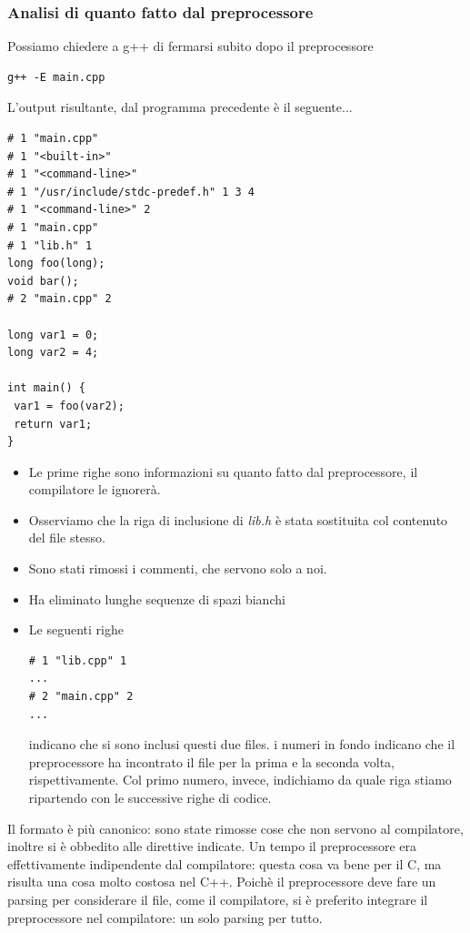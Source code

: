 \documentclass[11pt]{report}
\theoremstyle{definition}
\begin{document}
\subsubsection{Analisi di quanto fatto dal preprocessore} Possiamo chiedere a g++ di fermarsi subito dopo il preprocessore
\begin{verbatim}
g++ -E main.cpp
\end{verbatim}
L'output risultante, dal programma precedente è il seguente...
\begin{verbatim}
# 1 "main.cpp"
# 1 "<built-in>"
# 1 "<command-line>"
# 1 "/usr/include/stdc-predef.h" 1 3 4
# 1 "<command-line>" 2
# 1 "main.cpp"
# 1 "lib.h" 1
long foo(long);
void bar();
# 2 "main.cpp" 2

long var1 = 0;
long var2 = 4;

int main() {
 var1 = foo(var2);
 return var1;
}
\end{verbatim}
\begingroup
\begin{itemize}
\item Le prime righe sono informazioni su quanto fatto dal preprocessore, il compilatore le ignorerà.
\item Osserviamo che la riga di inclusione di \emph{lib.h} è stata sostituita col contenuto del file stesso. 
\item Sono stati rimossi i commenti, che servono solo a noi.
\item Ha eliminato lunghe sequenze di spazi bianchi
\item Le seguenti righe
\begin{verbatim}
# 1 "lib.cpp" 1
...
# 2 "main.cpp" 2
...
\end{verbatim}
indicano che si sono inclusi questi due files. i numeri in fondo indicano che il preprocessore ha incontrato il file per la prima e la seconda volta, rispettivamente. Col primo numero, invece, indichiamo da quale riga stiamo ripartendo con le successive righe di codice.
\end{itemize}
Il formato è più canonico: sono state rimosse cose che non servono al compilatore, inoltre si è obbedito alle direttive indicate. Un tempo il preprocessore era effettivamente indipendente dal compilatore: questa cosa va bene per il C, ma risulta una cosa molto costosa nel C++. Poichè il preprocessore deve fare un parsing per considerare il file, come il compilatore, si è preferito integrare il preprocessore nel compilatore: un solo parsing per tutto.
\endgroup
\end{document}
